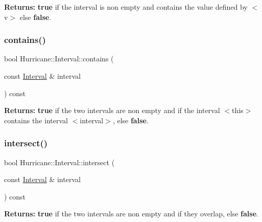 {\bfseries Returns\+:} {\bfseries true} if the interval is non empty and contains the value defined by {\ttfamily $<$v$>$} else {\bfseries false}. \mbox{\label{classHurricane_1_1Interval_ae86edb6867cf55459325cc35d971afbd}} 
\subsubsection{\texorpdfstring{contains()}{contains()}\hspace{0.1cm}{\footnotesize\ttfamily [2/2]}}
{\footnotesize\ttfamily bool Hurricane\+::\+Interval\+::contains (\begin{DoxyParamCaption}\item[{const \mbox{\hyperlink{classHurricane_1_1Interval}{Interval}} \&}]{interval }\end{DoxyParamCaption}) const}

{\bfseries Returns\+:} {\bfseries true} if the two intervals are non empty and if the interval {\ttfamily $<$this$>$} contains the interval {\ttfamily $<$interval$>$}, else {\bfseries false}. \mbox{\label{classHurricane_1_1Interval_acbaccbdd6649a32dd457455d277370f8}} 
\subsubsection{\texorpdfstring{intersect()}{intersect()}}
{\footnotesize\ttfamily bool Hurricane\+::\+Interval\+::intersect (\begin{DoxyParamCaption}\item[{const \mbox{\hyperlink{classHurricane_1_1Interval}{Interval}} \&}]{interval }\end{DoxyParamCaption}) const}

{\bfseries Returns\+:} {\bfseries true} if the two intervals are non empty and if they overlap, else {\bfseries false}. \mbox{\label{classHurricane_1_1Interval_a1e171021dcd5c0dc7e8afb0b2324c5ee}} 
